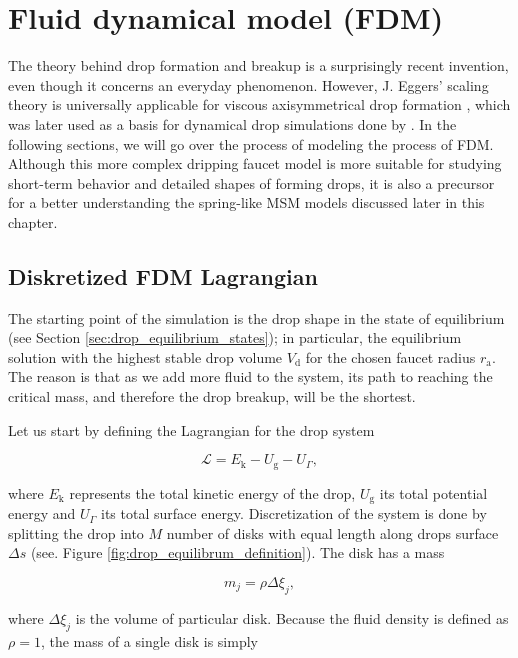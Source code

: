 \section{Fluid dynamical model (FDM)}
    The theory behind drop formation and breakup is a surprisingly recent invention, even though it concerns an everyday phenomenon. However, J. Eggers' scaling theory is universally applicable for viscous axisymmetrical drop formation \citep{eggers1993}, which was later used as a basis for dynamical drop simulations done by \citep{faucet1999}. In the following sections, we will go over the process of modeling the process of FDM. Although this more complex dripping faucet model is more suitable for studying short-term behavior and detailed shapes of forming drops, it is also a precursor for a better understanding the spring-like MSM models discussed later in this chapter.

\subsection{Diskretized FDM Lagrangian}
    The starting point of the simulation is the drop shape in the state of equilibrium (see Section \ref{sec:drop_equilibrium_states}); in particular, the equilibrium solution with the highest stable drop volume $V_{\mathrm{d}}$ for the chosen faucet radius $r_{\mathrm{a}}$. The reason is that as we add more fluid to the system, its path to reaching the critical mass, and therefore the drop breakup, will be the shortest.

    Let us start by defining the Lagrangian for the drop system
    
    \begin{equation}
        \mathcal{L} = E_{\mathrm{k}} - U_{\mathrm{g}} - U_{\Gamma},
    \end{equation}

    where $E_{\mathrm{k}}$ represents the total kinetic energy of the drop, $U_{\mathrm{g}}$ its total potential energy and $U_{\Gamma}$ its total surface energy. Discretization of the system is done by splitting the drop into $M$ number of disks with equal length along drops surface $\Delta s$ (see. Figure \ref{fig:drop_equilibrum_definition}). The disk has a mass

    \begin{equation}
        m_j = \rho \Delta \xi_j,
    \end{equation}

    where $\Delta \xi_j$ is the volume of particular disk. Because the fluid density is defined as $\rho = 1$, the mass of a single disk is simply


